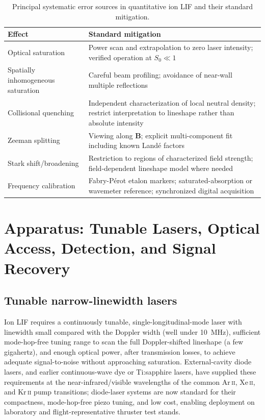 \begin{table}[h]
\centering
\caption{Principal systematic error sources in quantitative ion LIF and their standard mitigation.}
\label{tab:lif-errors}
\begin{tabularx}{\linewidth}{@{}lX@{}}
\toprule
Effect & Standard mitigation \\
\midrule
Optical saturation & Power scan and extrapolation to zero laser intensity; verified operation at $S_{0}\ll 1$ \\
Spatially inhomogeneous saturation & Careful beam profiling; avoidance of near-wall multiple reflections \\
Collisional quenching & Independent characterization of local neutral density; restrict interpretation to lineshape rather than absolute intensity \\
Zeeman splitting & Viewing along $\mathbf{B}$; explicit multi-component fit including known Land\'e factors \\
Stark shift/broadening & Restriction to regions of characterized field strength; field-dependent lineshape model where needed \\
Frequency calibration & Fabry-P\'erot etalon markers; saturated-absorption or wavemeter reference; synchronized digital acquisition \\
\bottomrule
\end{tabularx}
\end{table}

\section{Apparatus: Tunable Lasers, Optical Access, Detection, and Signal Recovery}

\subsection{Tunable narrow-linewidth lasers}

Ion LIF requires a continuously tunable, single-longitudinal-mode laser with linewidth small compared with the Doppler width (well under \SI{10}{\mega\hertz}), sufficient mode-hop-free tuning range to scan the full Doppler-shifted lineshape (a few gigahertz), and enough optical power, after transmission losses, to achieve adequate signal-to-noise without approaching saturation. External-cavity diode lasers, and earlier continuous-wave dye or Ti:sapphire lasers, have supplied these requirements at the near-infrared/visible wavelengths of the common Ar\,\textsc{ii}, Xe\,\textsc{ii}, and Kr\,\textsc{ii} pump transitions; diode-laser systems are now standard for their compactness, mode-hop-free piezo tuning, and low cost, enabling deployment on laboratory and flight-representative thruster test stands.

